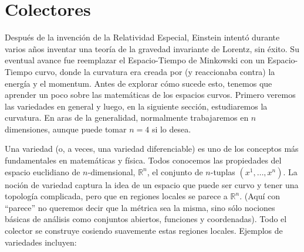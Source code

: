 \documentclass[11pt,b5paper,openany,twoside]{book}
\begin{document}
\chapter{Colectores}

Después de la invención de la Relatividad Especial, Einstein intentó durante varios años inventar una teoría de la gravedad invariante de Lorentz, sin éxito.
Su eventual avance fue reemplazar el Espacio-Tiempo de Minkowski con un Espacio-Tiempo curvo, donde la curvatura era creada por (y reaccionaba contra) la energía y el momentum.
Antes de explorar cómo sucede esto, tenemos que aprender un poco sobre las matemáticas de los espacios curvos.
Primero veremos las variedades en general y luego, en la siguiente sección, estudiaremos la curvatura.
En aras de la generalidad, normalmente trabajaremos en $n$ dimensiones, aunque puede tomar $n=4$ si lo desea.

Una variedad (o, a veces, una variedad diferenciable) es uno de los conceptos más fundamentales en matemáticas y física.
Todos conocemos las propiedades del espacio euclidiano de $n$-dimensional, $\mathbb{R}^n$, el conjunto de $n$-tuplas $(x^1,\ldots,x^n)$.
La noción de variedad captura la idea de un espacio que puede ser curvo y tener una topología complicada, pero que en regiones locales se parece a $\mathbb{R}^n$.
(Aquí con ``parece'' no queremos decir que la métrica sea la misma, sino sólo nociones básicas de análisis como conjuntos abiertos, funciones y coordenadas).
Todo el colector se construye cosiendo suavemente estas regiones locales.
Ejemplos de variedades incluyen:
\end{document}
